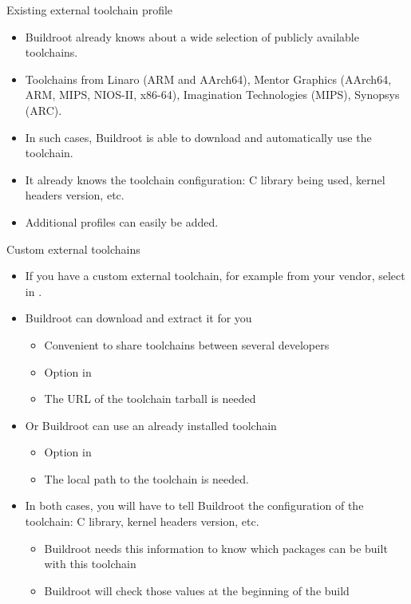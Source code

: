 \begin{frame}{Existing external toolchain profile}
  \begin{itemize}
  \item Buildroot already knows about a wide selection of publicly
    available toolchains.
  \item Toolchains from Linaro (ARM and AArch64), Mentor Graphics
    (AArch64, ARM, MIPS, NIOS-II, x86-64), Imagination Technologies
    (MIPS), Synopsys (ARC).
  \item In such cases, Buildroot is able to download and automatically
    use the toolchain.
  \item It already knows the toolchain configuration: C library being
    used, kernel headers version, etc.
  \item Additional profiles can easily be added.
  \end{itemize}
\end{frame}

\begin{frame}{Custom external toolchains}
  \begin{itemize}
  \item If you have a custom external toolchain, for example from your
    vendor, select  in .
  \item Buildroot can download and extract it for you
    \begin{itemize}
    \item Convenient to share toolchains between several
      developers
    \item Option  in 
    \item The URL of the toolchain tarball is needed
    \end{itemize}
  \item Or Buildroot can use an already installed toolchain
    \begin{itemize}
    \item Option  in 
    \item The local path to the toolchain is needed.
    \end{itemize}
  \item In both cases, you will have to tell Buildroot the
    configuration of the toolchain: C library, kernel headers version,
    etc.
    \begin{itemize}
    \item Buildroot needs this information to know which packages can
      be built with this toolchain
    \item Buildroot will check those values at the beginning of the
      build
    \end{itemize}
  \end{itemize}
\end{frame}

